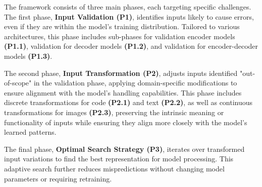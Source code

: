 The framework consists of three main phases, each targeting specific challenges. The first phase, \textbf{Input Validation (P1)}, identifies inputs likely to cause errors, even if they are within the model’s training distribution. Tailored to various architectures, this phase includes sub-phases for validation encoder models \textbf{(P1.1)}, validation for decoder models \textbf{(P1.2)}, and validation for encoder-decoder models \textbf{(P1.3)}.




The second phase, \textbf{Input Transformation (P2)}, adjusts inputs identified "out-of-scope" in the validation phase, applying domain-specific modifications to ensure alignment with the model's handling capabilities. This phase includes discrete transformations for code \textbf{(P2.1)} and text \textbf{(P2.2)}, as well as continuous transformations for images \textbf{(P2.3)}, preserving the intrinsic meaning or functionality of inputs while ensuring they align more closely with the model’s learned patterns.


The final phase, \textbf{Optimal Search Strategy (P3)}, iterates over transformed input variations to find the best representation for model processing. This adaptive search further reduces mispredictions without changing model parameters or requiring retraining.

